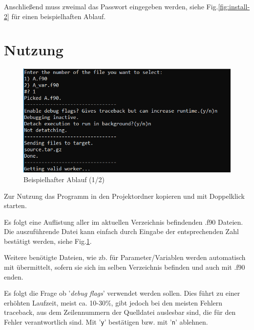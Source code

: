 \documentclass[11pt, a4paper]{article}
\begin{document}
Anschließend muss zweimal das Passwort eingegeben werden, siehe Fig.\ref{fig:install-2} für einen beispielhaften Ablauf.





\clearpage


\section{Nutzung}

\begin{figure}[htb!]
    \centering
    \includegraphics[width=0.7\linewidth]{./pics/2022-03-08_23-59_1.png}
    \caption{Beispielhafter Ablauf (1/2)}
    \label{fig:usage}
\end{figure}

Zur Nutzung das Programm in den Projektordner kopieren und mit Doppelklick starten.

Es folgt eine Auflistung aller im aktuellen Verzeichnis befindenden .f90 Dateien.
Die auszuführende Datei kann einfach durch Eingabe der entsprechenden Zahl bestätigt werden, siehe Fig.\ref{fig:usage}.

Weitere benötigte Dateien, wie zb. für Parameter/Variablen werden automatisch mit übermittelt, sofern sie sich im selben Verzeichnis befinden und auch mit .f90 enden.

Es folgt die Frage ob '\emph{debug flags}' verwendet werden sollen.
Dies führt zu einer erhöhten Laufzeit, meist ca. 10-30\%, gibt jedoch bei den meisten Fehlern traceback, aus dem Zeilennummern der Quelldatei auslesbar sind, die für den Fehler verantwortlich sind.
Mit '\texttt{y}' bestätigen bzw. mit '\texttt{n}' ablehnen.
\end{document}
